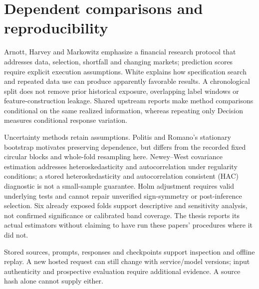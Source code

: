 \section{Dependent comparisons and reproducibility}\label{s:eabd76a8c5a70fc6}
Arnott, Harvey and Markowitz emphasize a financial research protocol that
addresses data, selection, shortfall and changing markets; prediction
scores require explicit execution assumptions. \autocite{arnott2019backtesting}
White explains how specification search and repeated data use can produce
apparently favorable results. \autocite{white2000reality} A chronological
split does not remove prior historical exposure, overlapping label
windows or feature-construction leakage. Shared upstream reports make
method comparisons conditional on the same realized information, whereas
repeating only Decision measures conditional response variation.

Uncertainty methods retain assumptions. Politis and Romano's stationary
bootstrap motivates preserving dependence, but differs from the recorded
fixed circular blocks and whole-fold resampling here.
\autocite{politis1994stationary} Newey--West covariance estimation addresses
heteroskedasticity and autocorrelation under regularity conditions; a stored heteroskedasticity and autocorrelation consistent (HAC) diagnostic is not a small-sample guarantee.
\autocite{newey1987hac} Holm adjustment requires valid underlying tests
and cannot repair unverified sign-symmetry or post-inference selection.
\autocite{holm1979multiple} Six already exposed folds support descriptive
and sensitivity analysis, not confirmed significance or calibrated band
coverage. The thesis reports its actual estimators without claiming to
have run these papers' procedures where it did not.

Stored sources, prompts, responses and checkpoints support inspection and
offline replay. A new hosted request can still change with service/model
versions; input authenticity and prospective evaluation require additional
evidence. A source hash alone cannot supply either.

